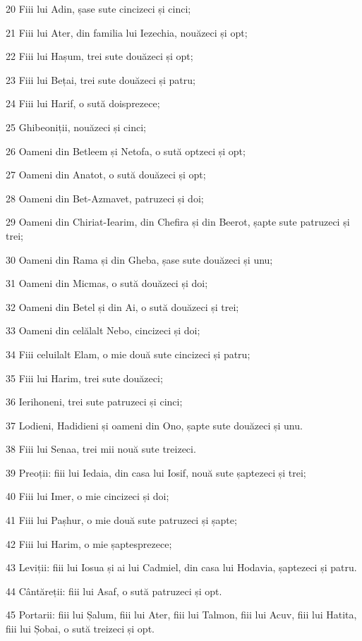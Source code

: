 \par 20 Fiii lui Adin, șase sute cincizeci și cinci;
\par 21 Fiii lui Ater, din familia lui Iezechia, nouăzeci și opt;
\par 22 Fiii lui Hașum, trei sute douăzeci și opt;
\par 23 Fiii lui Bețai, trei sute douăzeci și patru;
\par 24 Fiii lui Harif, o sută doisprezece;
\par 25 Ghibeoniții, nouăzeci și cinci;
\par 26 Oameni din Betleem și Netofa, o sută optzeci și opt;
\par 27 Oameni din Anatot, o sută douăzeci și opt;
\par 28 Oameni din Bet-Azmavet, patruzeci și doi;
\par 29 Oameni din Chiriat-Iearim, din Chefira și din Beerot, șapte sute patruzeci și trei;
\par 30 Oameni din Rama și din Gheba, șase sute douăzeci și unu;
\par 31 Oameni din Micmas, o sută douăzeci și doi;
\par 32 Oameni din Betel și din Ai, o sută douăzeci și trei;
\par 33 Oameni din celălalt Nebo, cincizeci și doi;
\par 34 Fiii celuilalt Elam, o mie două sute cincizeci și patru;
\par 35 Fiii lui Harim, trei sute douăzeci;
\par 36 Ierihoneni, trei sute patruzeci și cinci;
\par 37 Lodieni, Hadidieni și oameni din Ono, șapte sute douăzeci și unu.
\par 38 Fiii lui Senaa, trei mii nouă sute treizeci.
\par 39 Preoții: fiii lui Iedaia, din casa lui Iosif, nouă sute șaptezeci și trei;
\par 40 Fiii lui Imer, o mie cincizeci și doi;
\par 41 Fiii lui Pașhur, o mie două sute patruzeci și șapte;
\par 42 Fiii lui Harim, o mie șaptesprezece;
\par 43 Leviții: fiii lui Iosua și ai lui Cadmiel, din casa lui Hodavia, șaptezeci și patru.
\par 44 Cântăreții: fiii lui Asaf, o sută patruzeci și opt.
\par 45 Portarii: fiii lui Șalum, fiii lui Ater, fiii lui Talmon, fiii lui Acuv, fiii lui Hatita, fiii lui Șobai, o sută treizeci și opt.
